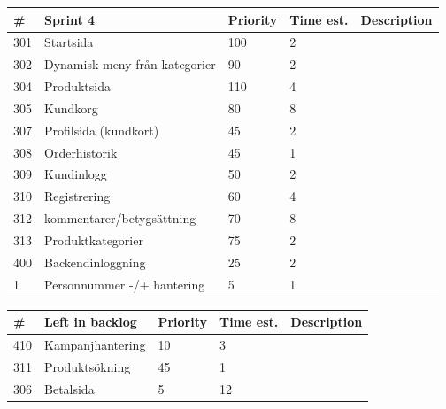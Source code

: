 \documentclass[paper=a4, fontsize=11pt]{report} %
\begin{document}
\begin{itemize}

	\begin{tabular}{|l|l|l|l|l|}
		\hline
		 \#  & Sprint 4                      & Priority & Time est. & Description \\ \hline
		 301 & Startsida                     & 100      & 2         &             \\ \hline
		 302 & Dynamisk meny från kategorier & 90       & 2         &             \\ \hline
		 304 & Produktsida                   & 110      & 4         &             \\ \hline
		 305 & Kundkorg                      & 80       & 8         &             \\ \hline
		 307 & Profilsida (kundkort)         & 45       & 2         &             \\ \hline
		 308 & Orderhistorik                 & 45       & 1         &             \\ \hline
		 309 & Kundinlogg                    & 50       & 2         &             \\ \hline
		 310 & Registrering                  & 60       & 4         &             \\ \hline
		 312 & kommentarer/betygsättning     & 70       & 8         &             \\ \hline
		 313 & Produktkategorier             & 75       & 2         &             \\ \hline
		 400 & Backendinloggning             & 25       & 2         &             \\ \hline
		 1   & Personnummer -/+ hantering    & 5        & 1         &             \\ \hline
	\end{tabular}

	\begin{tabular}{|l|l|l|l|l|}
		 \hline
		 \#  & Left in backlog  & Priority & Time est. & Description \\ \hline
		 410 & Kampanjhantering & 10       & 3         &             \\ \hline
		 311 & Produktsökning   & 45       & 1         &             \\ \hline
		 306 & Betalsida        & 5        & 12        &             \\ \hline
	\end{tabular}



\end{itemize}
\end{document}
